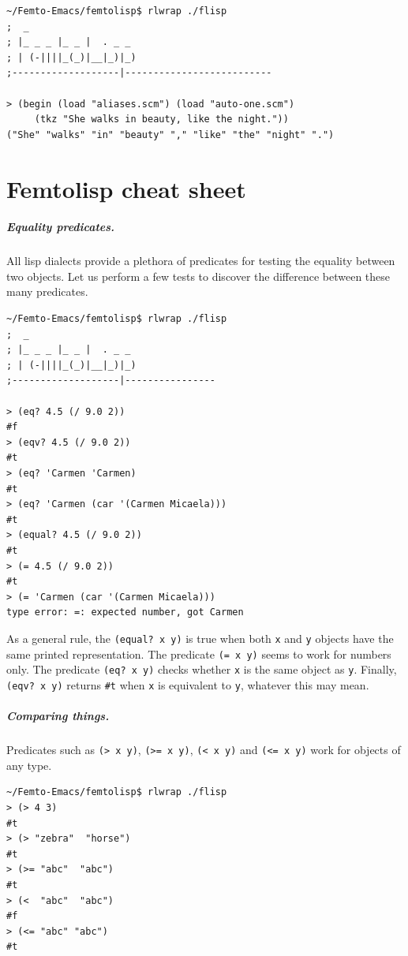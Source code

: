 \documentclass[a4paper,12pt]{book}
\begin{document}
\begin{verbatim}
~/Femto-Emacs/femtolisp$ rlwrap ./flisp
;  _
; |_ _ _ |_ _ |  . _ _
; | (-||||_(_)|__|_)|_)
;-------------------|--------------------------

> (begin (load "aliases.scm") (load "auto-one.scm")
     (tkz "She walks in beauty, like the night."))
("She" "walks" "in" "beauty" "," "like" "the" "night" ".")
\end{verbatim}


\appendix

\chapter{Femtolisp cheat sheet}

\paragraph{Equality predicates.}
All lisp dialects provide a plethora
of predicates for testing the  equality
between two objects. Let us perform a few tests
to discover the difference between these
many predicates.

\begin{Verbatim}[fontsize=\small,
frame=single]
~/Femto-Emacs/femtolisp$ rlwrap ./flisp
;  _
; |_ _ _ |_ _ |  . _ _
; | (-||||_(_)|__|_)|_)
;-------------------|----------------

> (eq? 4.5 (/ 9.0 2))
#f
> (eqv? 4.5 (/ 9.0 2))
#t
> (eq? 'Carmen 'Carmen)
#t
> (eq? 'Carmen (car '(Carmen Micaela)))
#t
> (equal? 4.5 (/ 9.0 2))
#t
> (= 4.5 (/ 9.0 2))
#t
> (= 'Carmen (car '(Carmen Micaela)))
type error: =: expected number, got Carmen
\end{Verbatim}
As a general rule, the \verb|(equal? x y)| 
is true when both \verb|x| and \verb|y|
objects have the same printed
representation. The predicate \verb|(= x y)| seems to work
for numbers only. The predicate \verb|(eq? x y)|
checks whether \verb|x| is the same object as \verb|y|.
Finally, \verb|(eqv? x y)| returns \verb|#t| when
\verb|x| is equivalent to \verb|y|, whatever this
may mean.

\paragraph{Comparing things.}
Predicates such as \verb|(> x y)|,
\verb|(>= x y)|, \verb|(< x y)| and \verb|(<= x y)|
work for objects of any type.

\begin{Verbatim}[fontsize=\small,
frame=single]
~/Femto-Emacs/femtolisp$ rlwrap ./flisp
> (> 4 3)
#t
> (> "zebra"  "horse")
#t
> (>= "abc"  "abc")
#t
> (<  "abc"  "abc")
#f
> (<= "abc" "abc")
#t
\end{Verbatim}
\end{document}

